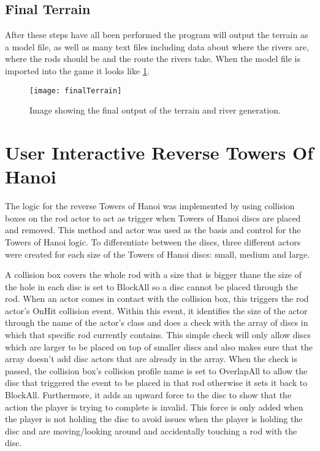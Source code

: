 \subsection{Final Terrain}
	After these steps have all been performed the program will output the terrain as a model file, as well as many text files including data about where the rivers are, where the rods should be and the route the rivers take. When the model file is imported into the game it looks like \ref{fig:finalTerrain}.

\begin{figure}[H]
	\texttt{[image: finalTerrain]}
	\centering
	\caption{Image showing the final output of the terrain and river generation.}
	\label{fig:finalTerrain}
\end{figure}


\section{User Interactive Reverse Towers Of Hanoi}
The logic for the reverse Towers of Hanoi was implemented by using collision boxes on the rod actor to act as trigger when Towers of Hanoi discs are placed and removed. This method and actor was used as the basis and control for the Towers of Hanoi logic. To differentiate between the discs, three different actors were created for each size of the Towers of Hanoi discs: small, medium and large. 
\newline
\par
A collision box covers the whole rod with a size that is bigger thane the size of the hole in each disc is set to BlockAll so a disc cannot be placed through the rod. When an actor comes in contact with the collision box, this triggers the rod actor's OnHit collision event. Within this event, it identifies the size of the actor through the name of the actor's class and does a check with the array of discs in which that specific rod currently contains. This simple check will only allow discs which are larger to be placed on top of smaller discs and also makes sure that the array doesn't add disc actors that are already in the array. When the check is passed, the collision box's collision profile name is set to OverlapAll to allow the disc that triggered the event to be placed in that rod otherwise it sets it back to BlockAll. Furthermore, it adds an upward force to the disc to show that the action the player is trying to complete is invalid. This force is only added when the player is not holding the disc to avoid issues when the player is holding the disc and are moving/looking around and accidentally touching a rod with the disc.
